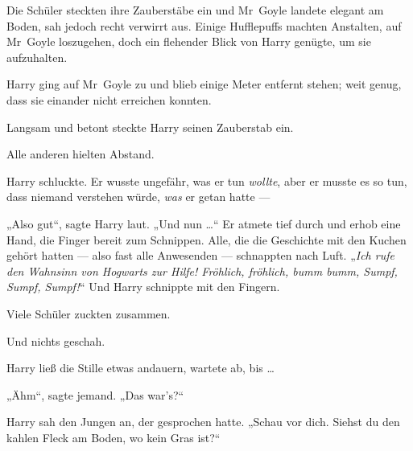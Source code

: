 Die Schüler steckten ihre Zauberstäbe ein und Mr~Goyle landete elegant am Boden, sah jedoch recht verwirrt aus. Einige Hufflepuffs machten Anstalten, auf Mr~Goyle loszugehen, doch ein flehender Blick von Harry genügte, um sie aufzuhalten.

Harry ging auf Mr~Goyle zu und blieb einige Meter entfernt stehen; weit genug, dass sie einander nicht erreichen konnten.

Langsam und betont steckte Harry seinen Zauberstab ein.

Alle anderen hielten Abstand.

Harry schluckte. Er wusste ungefähr, was er tun \emph{wollte}, aber er musste es so tun, dass niemand verstehen würde, \emph{was} er getan hatte —

„Also gut“, sagte Harry laut.
„Und nun …“ Er atmete tief durch und erhob eine Hand, die Finger bereit zum Schnippen. Alle, die die Geschichte mit den Kuchen gehört hatten — also fast alle Anwesenden — schnappten nach Luft.
„\emph{Ich rufe den Wahnsinn von Hogwarts zur Hilfe! Fröhlich, fröhlich, bumm bumm, Sumpf, Sumpf, Sumpf!}“ Und Harry schnippte mit den Fingern.

Viele Schüler zuckten zusammen.

Und nichts geschah.

Harry ließ die Stille etwas andauern, wartete ab, bis …

„Ähm“, sagte jemand.
„Das war’s?“

Harry sah den Jungen an, der gesprochen hatte.
„Schau vor dich. Siehst du den kahlen Fleck am Boden, wo kein Gras ist?“

